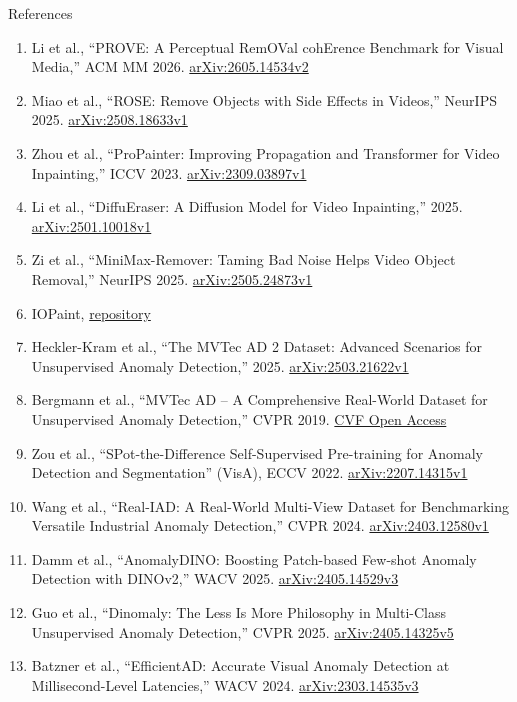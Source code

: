 \begin{frame}[allowframebreaks=0.9]{References}
\begin{enumerate}
    \item Li et al., ``PROVE: A Perceptual RemOVal cohErence Benchmark for Visual Media,'' ACM MM 2026. \href{https://arxiv.org/abs/2605.14534v2}{arXiv:2605.14534v2}
    \item Miao et al., ``ROSE: Remove Objects with Side Effects in Videos,'' NeurIPS 2025. \href{https://arxiv.org/abs/2508.18633v1}{arXiv:2508.18633v1}
    \item Zhou et al., ``ProPainter: Improving Propagation and Transformer for Video Inpainting,'' ICCV 2023. \href{https://arxiv.org/abs/2309.03897v1}{arXiv:2309.03897v1}
    \item Li et al., ``DiffuEraser: A Diffusion Model for Video Inpainting,'' 2025. \href{https://arxiv.org/abs/2501.10018v1}{arXiv:2501.10018v1}
    \item Zi et al., ``MiniMax-Remover: Taming Bad Noise Helps Video Object Removal,'' NeurIPS 2025. \href{https://arxiv.org/abs/2505.24873v1}{arXiv:2505.24873v1}
    \item IOPaint, \href{https://github.com/Sanster/IOPaint}{repository}
    \item Heckler-Kram et al., ``The MVTec AD 2 Dataset: Advanced Scenarios for Unsupervised Anomaly Detection,'' 2025. \href{https://arxiv.org/abs/2503.21622v1}{arXiv:2503.21622v1}
    \item Bergmann et al., ``MVTec AD -- A Comprehensive Real-World Dataset for Unsupervised Anomaly Detection,'' CVPR 2019. \href{https://openaccess.thecvf.com/content_CVPR_2019/html/Bergmann_MVTec_AD_--_A_Comprehensive_Real-World_Dataset_for_Unsupervised_Anomaly_CVPR_2019_paper.html}{CVF Open Access}
    \item Zou et al., ``SPot-the-Difference Self-Supervised Pre-training for Anomaly Detection and Segmentation'' (VisA), ECCV 2022. \href{https://arxiv.org/abs/2207.14315v1}{arXiv:2207.14315v1}
    \item Wang et al., ``Real-IAD: A Real-World Multi-View Dataset for Benchmarking Versatile Industrial Anomaly Detection,'' CVPR 2024. \href{https://arxiv.org/abs/2403.12580v1}{arXiv:2403.12580v1}
    \item Damm et al., ``AnomalyDINO: Boosting Patch-based Few-shot Anomaly Detection with DINOv2,'' WACV 2025. \href{https://arxiv.org/abs/2405.14529v3}{arXiv:2405.14529v3}
    \item Guo et al., ``Dinomaly: The Less Is More Philosophy in Multi-Class Unsupervised Anomaly Detection,'' CVPR 2025. \href{https://arxiv.org/abs/2405.14325v5}{arXiv:2405.14325v5}
    \item Batzner et al., ``EfficientAD: Accurate Visual Anomaly Detection at Millisecond-Level Latencies,'' WACV 2024. \href{https://arxiv.org/abs/2303.14535v3}{arXiv:2303.14535v3}

\end{enumerate}
\end{frame}
